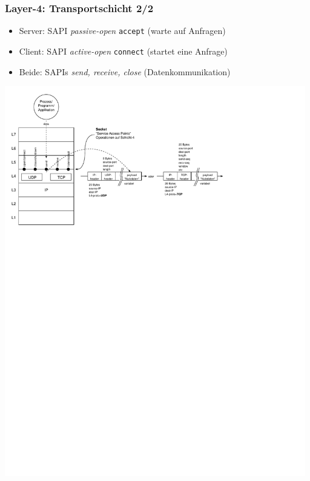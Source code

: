 \documentclass[ignorenonframetext]{beamer}
\begin{document}
\begin{frame}
\frametitle{Layer-4: Transportschicht 2/2}
\begin{itemize}
  \item{Server: SAPI \emph{passive-open} \texttt{accept} (warte auf Anfragen)}
  \item{Client: SAPI \emph{active-open} \texttt{connect} (startet eine Anfrage)}
  \item{Beide: SAPIs \emph{send, receive, close} (Datenkommunikation)}
\end{itemize}
\includegraphics[height=17cm]{stack}
\end{frame}
\end{document}
